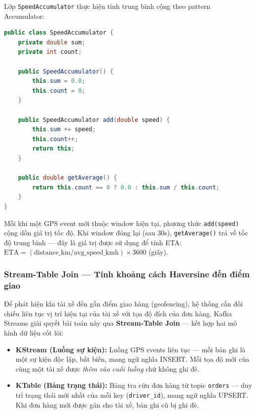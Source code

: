 \noindent
Lớp \texttt{SpeedAccumulator} thực hiện tính trung bình cộng theo pattern Accumulator:

\begin{lstlisting}[language=Java, caption={SpeedAccumulator — Accumulator tính tốc độ trung bình}, label={lst:speed-accumulator}]
public class SpeedAccumulator {
    private double sum;
    private int count;

    public SpeedAccumulator() {
        this.sum = 0.0;
        this.count = 0;
    }

    public SpeedAccumulator add(double speed) {
        this.sum += speed;
        this.count++;
        return this;
    }

    public double getAverage() {
        return this.count == 0 ? 0.0 : this.sum / this.count;
    }
}
\end{lstlisting}

Mỗi khi một GPS event mới thuộc window hiện tại, phương thức \texttt{add(speed)} cộng dồn giá trị tốc độ. Khi window đóng lại (sau 30s), \texttt{getAverage()} trả về tốc độ trung bình — đây là giá trị được sử dụng để tính ETA: $\text{ETA} = (\text{distance\_km} / \text{avg\_speed\_kmh}) \times 3600$ (giây).

\subsubsection{Stream-Table Join — Tính khoảng cách Haversine đến điểm giao}
\label{sec:stream-table-join}

Để phát hiện khi tài xế đến gần điểm giao hàng (geofencing), hệ thống cần đối chiếu liên tục vị trí hiện tại của tài xế với tọa độ đích của đơn hàng. Kafka Streams giải quyết bài toán này qua \textbf{Stream-Table Join} — kết hợp hai mô hình dữ liệu cốt lõi:

\begin{itemize}
    \item \textbf{KStream (Luồng sự kiện):} Luồng GPS events liên tục — mỗi bản ghi là một sự kiện độc lập, bất biến, mang ngữ nghĩa INSERT. Mỗi tọa độ mới của cùng một tài xế được \textit{thêm vào cuối luồng} chứ không ghi đè.
    \item \textbf{KTable (Bảng trạng thái):} Bảng tra cứu đơn hàng từ topic \texttt{orders} — duy trì trạng thái mới nhất của mỗi key (\texttt{driver\_id}), mang ngữ nghĩa UPSERT. Khi đơn hàng mới được gán cho tài xế, bản ghi cũ bị ghi đè.
\end{itemize}

